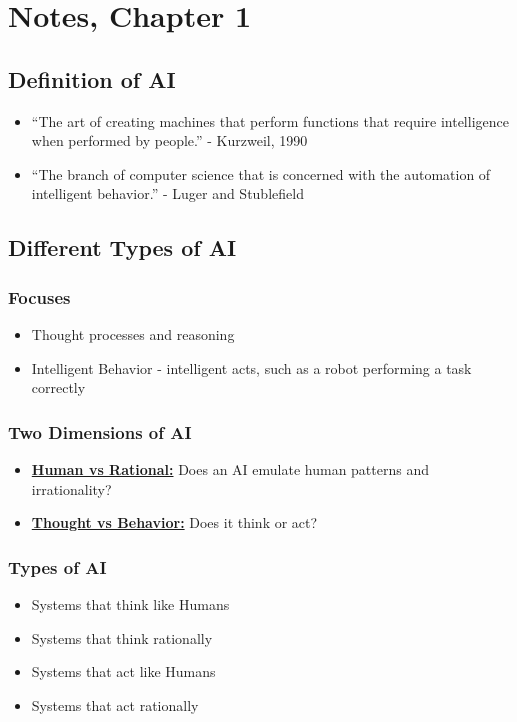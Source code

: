 \documentclass[12pt]{article}
\newcommand{\definition}[1]{\underline{\textbf{#1}}}
\begin{document}
\section*{Notes, Chapter 1}

\subsection*{Definition of AI}

\begin{itemize}
    \item ``The art of creating machines that perform functions that require intelligence when performed by people.'' - Kurzweil, 1990

    \item ``The branch of computer science that is concerned with the automation of intelligent behavior.'' - Luger and Stublefield
\end{itemize}


\subsection*{Different Types of AI}

\subsubsection*{Focuses}
\begin{itemize}
    \item Thought processes and reasoning
    \item Intelligent Behavior - intelligent acts, such as a robot performing a task correctly
\end{itemize}

\subsubsection*{Two Dimensions of AI}
\begin{itemize}
    \item \definition{Human vs Rational:} Does an AI emulate human patterns and irrationality?
    \item \definition{Thought vs Behavior:} Does it think or act?
\end{itemize}

\subsubsection*{Types of AI}
\begin{itemize}
    \item Systems that think like Humans
    \item Systems that think rationally
    \item Systems that act like Humans
    \item Systems that act rationally
\end{itemize}
\end{document}
